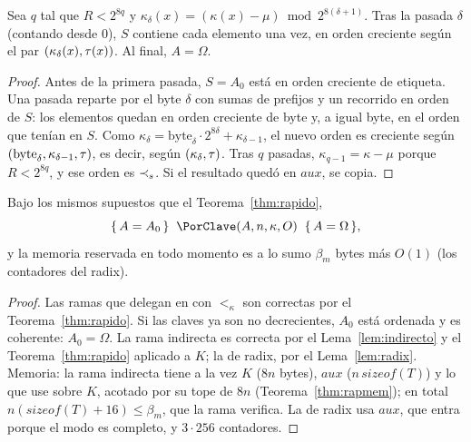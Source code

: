 \begin{lema}\label{lem:radix}
Sea $q$ tal que $R<2^{8q}$ y $\kappa_\delta(x)=(\kappa(x)-\mu)\bmod 2^{8(\delta+1)}$.
Tras la pasada $\delta$ (contando desde 0), $S$ contiene cada elemento una vez, en orden
creciente según el par $(\kappa_\delta(x),\tau(x))$. Al final, $A=\Omega$.
\end{lema}
\begin{proof}
Antes de la primera pasada, $S=A_0$ está en orden creciente de etiqueta. Una pasada
reparte por el byte $\delta$ con sumas de prefijos y un recorrido en orden de $S$: los
elementos quedan en orden creciente de byte y, a igual byte, en el orden que tenían en
$S$. Como $\kappa_\delta=\text{byte}_\delta\cdot2^{8\delta}+\kappa_{\delta-1}$, el
nuevo orden es creciente según $(\text{byte}_\delta,\kappa_{\delta-1},\tau)$, es decir,
según $(\kappa_\delta,\tau)$. Tras $q$ pasadas, $\kappa_{q-1}=\kappa-\mu$ porque
$R<2^{8q}$, y ese orden es $\prec_{s}$. Si el resultado quedó en $\mathit{aux}$, se copia.
\end{proof}

\begin{teorema}[\PorClave]\label{thm:clave}
Bajo los mismos supuestos que el Teorema~\ref{thm:rapido},
\[\hoare{A=A_0}{\PorClave(A,n,\kappa,O)}{A=\Omega},\]
y la memoria reservada en todo
momento es a lo sumo $\beta_m$ bytes más $O(1)$ (los contadores del radix).
\end{teorema}
\begin{proof}
Las ramas que delegan en \Rapido con $\lt_\kappa$ son correctas por el
Teorema~\ref{thm:rapido}. Si las claves ya son no decrecientes, $A_0$ está ordenada y es
coherente: $A_0=\Omega$. La rama indirecta es correcta por el Lema~\ref{lem:indirecto}
y el Teorema~\ref{thm:rapido} aplicado a $K$; la de radix, por el
Lema~\ref{lem:radix}. Memoria: la rama indirecta tiene a la vez $K$ ($8n$ bytes),
$\mathit{aux}$ ($n\,\mathit{sizeof}(T)$) y lo que use \Rapido sobre $K$, acotado por su
tope de $8n$ (Teorema~\ref{thm:rapmem}); en total $n(\mathit{sizeof}(T)+16)\le\beta_m$,
que la rama verifica. La de radix usa $\mathit{aux}$, que entra porque el modo es
completo, y $3\cdot256$ contadores.
\end{proof}

